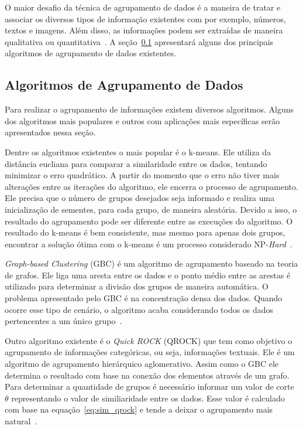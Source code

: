 O maior desafio da técnica de agrupamento de dados é a maneira de tratar e associar os diversos tipos de informação existentes com por exemplo, números, textos e imagens. Além disso, as informações podem ser extraídas de maneira qualitativa ou quantitativa~\cite{witten:2011}. A seção~\ref{sec:algoritmosclustering} apresentará alguns dos principais algoritmos de agrupamento de dados existentes.

\subsection{Algoritmos de Agrupamento de Dados}
\label{sec:algoritmosclustering}
Para realizar o agrupamento de informações existem diversos algoritmos. Alguns dos algoritmos mais populares e outros com aplicações mais específicas serão apresentados nessa seção.

Dentre os algoritmos existentes o mais popular é o k-means. Ele utiliza da distância eucliana para comparar a similaridade entre os dados, tentando minimizar o erro quadrático. A partir do momento que o erro não tiver mais alterações entre as iterações do algoritmo, ele encerra o processo de agrupamento. Ele precisa que o número de grupos desejados seja informado e realiza uma inicialização de sementes, para cada grupo, de maneira aleatória. Devido a isso, o resultado do agrupamento pode ser diferente entre as execuções do algoritmo. O resultado do k-means é bem consistente, mas mesmo para apenas dois grupos, encontrar a solução ótima com o k-means é um processo considerado NP-\emph{Hard}~\cite{jain:2010, witten:2011}.

\emph{Graph-based Clustering} (GBC) é um algoritmo de agrupamento baseado na teoria de grafos. Ele liga uma aresta entre os dados e o ponto médio entre as arestas é utilizado para determinar a divisão dos grupos de maneira automática. O problema apresentado pelo GBC é na concentração densa dos dados. Quando ocorre esse tipo de cenário, o algoritmo acaba considerando todos os dados pertencentes a um único grupo~\cite{muhlenbach:2009}.

Outro algoritmo existente é o \emph{Quick ROCK} (QROCK) que tem como objetivo o agrupamento de informações categóricas, ou seja, informações textuais. Ele é um algoritmo de agrupamento hierárquico aglomerativo. Assim como o GBC ele determina o resultado com base na conexão dos elementos através de um grafo. Para determinar a quantidade de grupos é necessário informar um valor de corte $\theta$ representando o valor de similiaridade entre os dados. Esse valor é calculado com base na equação~\ref{eq:sim_qrock} e tende a deixar o agrupamento mais natural~\cite{dutta:2005}.

